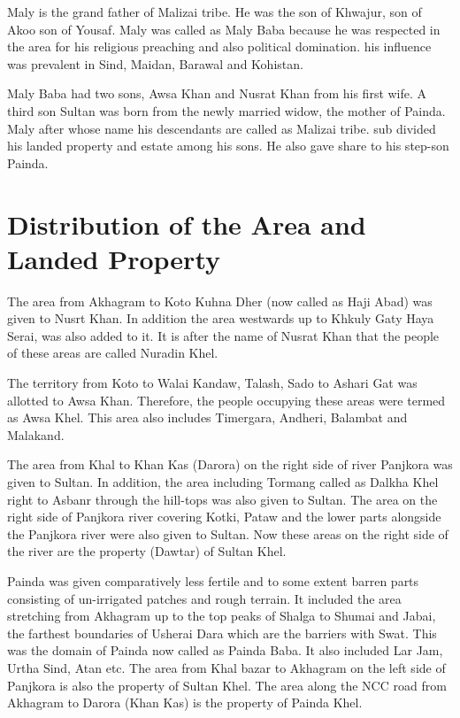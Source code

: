 \documentclass[twoside,openright]{book}
\begin{document}
Maly is the grand father of Malizai tribe. He was the son of Khwajur, son of
Akoo son of Yousaf. Maly was called as Maly Baba because he was respected in the
area for his religious preaching and also political domination. his influence
was prevalent in Sind, Maidan, Barawal and Kohistan.

Maly Baba had two sons, Awsa Khan and Nusrat Khan from his first wife. A third
son Sultan was born from the newly married widow, the mother of Painda. Maly
after whose name his descendants are called as Malizai tribe. sub divided his
landed property and estate among his sons. He also gave share to his step-son
Painda.

\section{Distribution of the Area and Landed Property}

The area from Akhagram to Koto Kuhna Dher (now called as Haji Abad)
was given to Nusrt Khan. In addition the area westwards up
to Khkuly Gaty Haya Serai, was also added to it. It is after the
name of Nusrat Khan that the people of these areas are called Nuradin Khel.

The territory from Koto to Walai Kandaw, Talash, Sado to Ashari Gat was allotted
to Awsa Khan. Therefore, the people occupying these areas were termed as Awsa
Khel. This area also includes Timergara, Andheri, Balambat and Malakand.

The area from Khal to Khan Kas (Darora) on the right side of river Panjkora was
given to Sultan. In addition, the area including Tormang called as Dalkha Khel
right to Asbanr through the hill-tops was also given to Sultan. The area on the
right side of Panjkora river covering Kotki, Pataw and the lower parts alongside
the Panjkora river were also given to Sultan. Now these areas on the right side
of the river are the property (Dawtar) of Sultan Khel.

Painda was given comparatively less fertile and to some extent barren parts
consisting of un-irrigated patches and rough terrain. It included the area
stretching from Akhagram up to the top peaks of Shalga to Shumai and Jabai, the
farthest boundaries of Usherai Dara which are the barriers with Swat. This was
the domain of Painda now called as Painda Baba. It also included Lar Jam, Urtha
Sind, Atan etc. The area from Khal bazar to Akhagram on the left side of
Panjkora is also the property of Sultan Khel. The area along the NCC road from
Akhagram to Darora (Khan Kas) is the property of Painda Khel.
\end{document}
